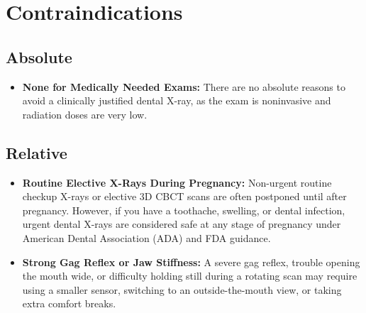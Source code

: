\section{Contraindications}

\subsection{Absolute}
\begin{itemize}
\item \textbf{None for Medically Needed Exams:} There are no absolute reasons to avoid a clinically justified dental X-ray, as the exam is noninvasive and radiation doses are very low.
\end{itemize}

\subsection{Relative}
\begin{itemize}
\item \textbf{Routine Elective X-Rays During Pregnancy:} Non-urgent routine checkup X-rays or elective 3D CBCT scans are often postponed until after pregnancy. However, if you have a toothache, swelling, or dental infection, urgent dental X-rays are considered safe at any stage of pregnancy under American Dental Association (ADA) and FDA guidance.
\item \textbf{Strong Gag Reflex or Jaw Stiffness:} A severe gag reflex, trouble opening the mouth wide, or difficulty holding still during a rotating scan may require using a smaller sensor, switching to an outside-the-mouth view, or taking extra comfort breaks.
\end{itemize}

